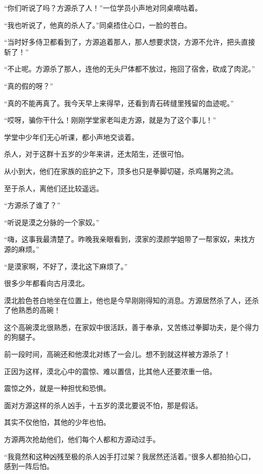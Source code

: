 
\begin{this_body}



“你们听说了吗？方源杀了人！”一位学员小声地对同桌嘀咕着。

“我也听说了，他真的杀人了。”同桌捂住心口，一脸的苍白。

“当时好多侍卫都看到了，方源追着那人，那人想要求饶，方源不允许，把头直接斩了！”

“不止呢。方源杀了那人，连他的无头尸体都不放过，拖回了宿舍，砍成了肉泥。”

“真的假的呀？”

“真的不能再真了。我今天早上来得早，还看到青石砖缝里残留的血迹呢。”

“哎呀，骗你干什么！刚刚学堂家老叫走方源，就是为了这个事儿！”

学堂中少年们无心听课，都小声地交谈着。

杀人，对于这群十五岁的少年来讲，还太陌生，还很可怕。

从小到大，他们在家族的庇护之下，顶多也只是拳脚切磋，杀鸡屠狗之流。

至于杀人，离他们还比较遥远。

“方源杀了谁了？”

“听说是漠之分脉的一个家奴。”

“嗨，这事我最清楚了。昨晚我亲眼看到，漠家的漠颜学姐带了一帮家奴，来找方源的麻烦。”

“是漠家啊，不好了，漠北这下麻烦了。”

很多少年都看向古月漠北。

漠北脸色苍白地坐在位置上，他也是今早刚刚得知的消息。方源居然杀了人，还杀了他熟悉的高碗！

这个高碗漠北很熟悉，在家奴中很活跃，善于奉承，又苦练过拳脚功夫，是个得力的狗腿子。

前一段时间，高碗还和他漠北对练了一会儿。想不到就这样被方源杀了！

正因为这样，漠北心中的震惊、难以置信，比其他人还要浓重一倍。

震惊之外，就是一种担忧和恐惧。

面对方源这样的杀人凶手，十五岁的漠北要说不怕，那是假话。

其实不仅他怕，其他的少年也怕。

方源两次抢劫他们，他们每个人都和方源动过手。

“我竟然和这种凶残至极的杀人凶手打过架？我居然还活着。”很多人都拍拍心口，感到一阵后怕。


\end{this_body}
